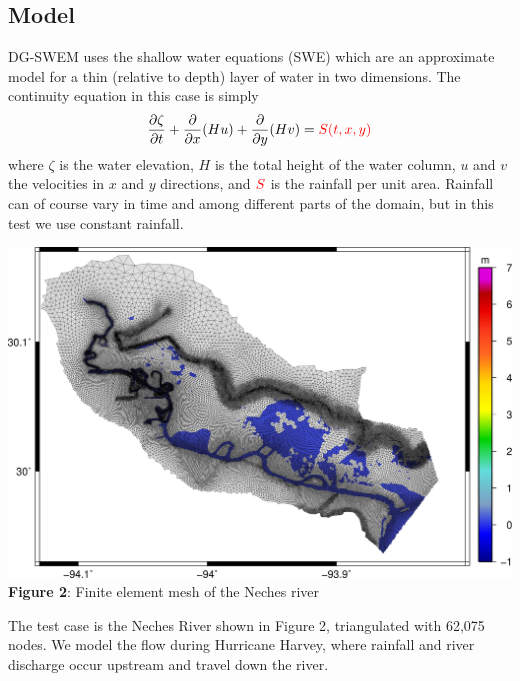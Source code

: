 \documentclass[american]{article}
\newcommand\pd[2]{\frac{\partial #1}{\partial #2}}
\begin{document}
\begin{multicols}{3}
\hrulefill

\section*{Model}
\noindent DG-SWEM uses the shallow water equations (SWE) which are an approximate model for a thin (relative to depth) layer of water in two dimensions. The continuity equation in this case is simply
\begin{align*}
  \pd{\zeta}{t} + \pd{}{x} (Hu) + \pd{}{y} (Hv) = {\color{red} S(t,x,y)}
\end{align*}
where $\zeta$ is the water elevation, $H$ is the total height of the water column, $u$ and $v$ the velocities in $x$ and $y$ directions, and $\color{red} S$ is the rainfall per unit area. Rainfall can of course vary in time and among different parts of the domain, but in this test we use constant rainfall.

\begin{center}
  \vspace{5mm}
  \includegraphics[width=0.95\linewidth]{media/grid.jpg}
  \textbf{Figure 2}: Finite element mesh of the Neches river
\end{center}

The test case is the Neches River shown in Figure 2, triangulated with 62,075 nodes. We model the flow during Hurricane Harvey, where rainfall and river discharge occur upstream and travel down the river.

\hrulefill

\end{multicols}
\end{document}
